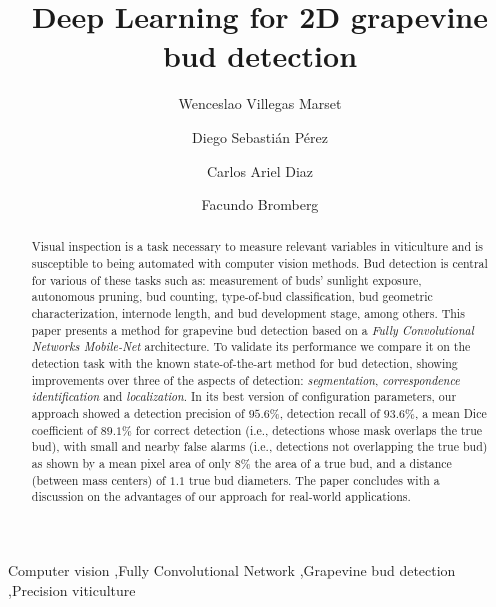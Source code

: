 \documentclass[a4paper,authoryear,review]{elsarticle}
\begin{document}
\begin{frontmatter}

\title{Deep Learning for 2D grapevine bud detection}

\author[utn]{Wenceslao Villegas Marset}

\author[utn]{Diego Sebastián Pérez}

\author[utn]{Carlos Ariel Diaz}

\author[utn,conicet]{Facundo Bromberg}

\address[utn]{Universidad Tecnológica Nacional, Facultad Regional Mendoza, Grupo de Inteligencia Artificial DHARMa, Dpto. de Sistemas de la Información. Rodríguez 273, CP 5500, Mendoza, Argentina.}

\address[conicet]{Consejo Nacional de Investigaciones Científicas y Técnicas (CONICET).}


\begin{abstract}
Visual inspection is a task necessary to measure relevant variables in viticulture and is susceptible to being automated with computer vision methods. Bud detection is central for various of these tasks such as: measurement of buds’ sunlight exposure, autonomous pruning, bud counting, type-of-bud classification, bud geometric characterization, internode length, and bud development stage, among others. This paper presents a method for grapevine bud detection based on a \emph{Fully Convolutional Networks Mobile-Net} architecture. To validate its performance we compare it on the detection task with the known state-of-the-art method for bud detection, showing improvements over three of the aspects of detection: \emph{segmentation}, \emph{correspondence identification} and \emph{localization}. In its best version of configuration parameters, our approach showed a detection precision of $95.6\%$, detection recall of $93.6\%$, a mean Dice coefficient of $89.1\%$ for correct detection (i.e., detections whose mask overlaps the true bud), with small and nearby false alarms (i.e., detections not overlapping the true bud) as shown by a mean pixel area of only $8\%$ the area of a true bud,  and a distance (between mass centers) of $1.1$ true bud diameters. The paper concludes with a discussion on the  advantages of our approach for real-world applications.
\end{abstract}

\begin{keyword}
Computer vision \sep Fully Convolutional Network \sep Grapevine bud detection \sep Precision viticulture
\end{keyword}

\end{frontmatter}
\end{document}
